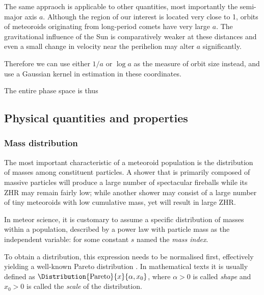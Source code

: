                 The same appraoch is applicable to other quantities, most importantly the semi-major axis $a$.
                Although the region of our interest is located very close to \SI{1}{\au},
                orbits of meteoroids originating from long-period comets have very large $a$.
                The gravitational influence of the Sun is comparatively weaker at these distances and
                even a small change in velocity near the perihelion may alter $a$ significantly.

                Therefore we can use either $1/a$ or $\log a$ as the measure of orbit size instead,
                and use a Gaussian kernel in estimation in these coordinates.

                The entire phase space is thus

    \subsection{Physical quantities and properties} \label{mp}
        \subsubsection{Mass distribution} \label{mpam}
            The most important characteristic of a meteoroid population is the distribution of masses
            among constituent particles. A shower that is primarily composed of massive particles
            will produce a large number of spectacular fireballs while its ZHR may remain fairly low;
            while another shower may consist of a large number of tiny meteoroids with low cumulative mass,
            yet will result in large ZHR.

            In meteor science, it is customary to assume a specific distribution of masses within a population,
            described by a power law with particle mass as the independent variable:
            for some constant $s$ named the \emph{mass index}.

            To obtain a distribution, this expression needs to be normalised first,
            effectively yielding a well-known Pareto distribution \citep{arnold1983}.
            In mathematical texts it is usually defined as $\Distribution{\mathrm{Pareto}}{x}{\alpha, x_0}$,
            where $\alpha > 0$ is called \emph{shape} and $x_0 > 0$ is called the \emph{scale} of the distribution.

